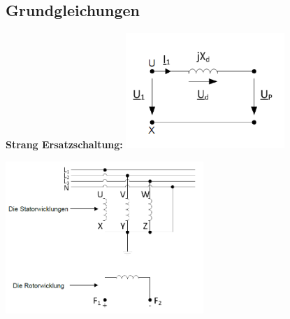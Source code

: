     \begin{minipage}[b]{0.5\linewidth}
        \subsection{Grundgleichungen}
        \textbf{Strang Ersatzschaltung:}\newline
        \includegraphics[width = 6cm]{images/Wicklung1}
    \end{minipage}
    \begin{minipage}[t]{0.5\linewidth}
        \includegraphics[width = 7.5cm]{images/Wicklungen}
    \end{minipage}
    \vspace{-1cm}
